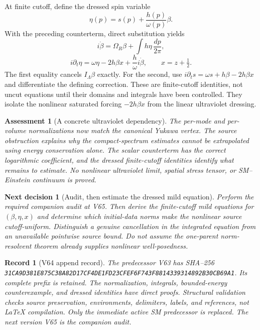 \documentclass[11pt]{article}
\newtheorem{decision}[theorem]{Next decision}
\newtheorem{assessment}[theorem]{Assessment}
\newtheorem{record}[theorem]{Record}
\theoremstyle{remark}
\begin{document}
At finite cutoff, define the dressed spin variable
\[
 \eta(p)=s(p)+\frac{h(p)}{\omega(p)}\beta .
\]
With the preceding counterterm, direct substitution yields
\[
 i\dot\beta=\Omega_R\beta+\int h\eta\,\frac{dp}{2\pi},
\]
\[
 i\partial_t\eta=
       \omega\eta-2h\beta x+\frac{h}{\omega}i\dot\beta,
                 \qquad x=z+\tfrac12 .
\]
The first equality cancels \(I_\Lambda\beta\) exactly.
For the second, use
\(i\partial_t s=\omega s+h\beta-2h\beta x\)
and differentiate the defining correction.
These are finite-cutoff identities, not uncut equations
until their domains and integrals have been controlled.
They isolate the nonlinear saturated forcing
\(-2h\beta x\) from the linear ultraviolet dressing.

\begin{assessment}[A concrete ultraviolet dependency]
\label{ass:v20v64}
The per-mode and per-volume normalizations now match the
canonical Yukawa vertex.  The source obstruction explains
why the compact-spectrum estimates cannot be extrapolated
using energy conservation alone.  The scalar counterterm
has the correct logarithmic coefficient, and the dressed
finite-cutoff identities identify what remains to estimate.
No nonlinear ultraviolet limit, spatial stress tensor,
or SM--Einstein continuum is proved.
\end{assessment}

\begin{decision}[Audit, then estimate the dressed mild equation]
\label{dec:v20v64-next}
Perform the required companion audit at V65.  Then
derive the finite-cutoff mild equations for
\((\beta,\eta,x)\) and determine which initial-data
norms make the nonlinear source cutoff-uniform.
Distinguish a genuine cancellation in the integrated
equation from an unavailable pointwise source bound.
Do not assume the one-parent norm-resolvent theorem
already supplies nonlinear well-posedness.
\end{decision}

\begin{record}[V64 append record]
\label{rec:v20v64}
The predecessor V63 has SHA--256
\texttt{31CA9D381E875C38A82D17CF4DE1FD23CFEF6F743F8814339314892B30CB69A1}.
Its complete prefix is retained.  The normalization,
integrals, bounded-energy counterexample, and dressed
identities have direct proofs.  Structural validation
checks source preservation, environments, delimiters,
labels, and references, not LaTeX compilation.
Only the immediate active SM predecessor is replaced.
The next version V65 is the companion audit.
\end{record}
\end{document}
